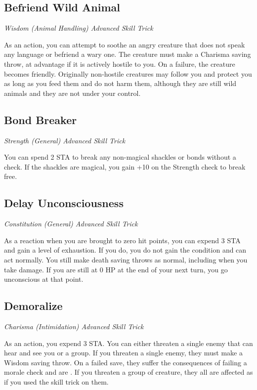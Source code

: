 \subsection{Befriend Wild Animal}

\textit{Wisdom (Animal Handling) Advanced Skill Trick}

As an action, you can attempt to soothe an angry creature that does not speak any language or befriend a wary one. The creature must make a Charisma saving throw, at advantage if it is actively hostile to you. On a failure, the creature becomes friendly. Originally non-hostile creatures may follow you and protect you as long as you feed them and do not harm them, although they are still wild animals and they are not under your control.

\subsection{Bond Breaker}

\textit{Strength (General) Advanced Skill Trick}

You can spend 2 STA to break any non-magical shackles or bonds without a check. If the shackles are magical, you gain +10 on the Strength check to break free.

\subsection{Delay Unconsciousness}

\textit{Constitution (General) Advanced Skill Trick}

As a reaction when you are brought to zero hit points, you can expend 3 STA and gain a level of exhaustion. If you do, you do not gain the  condition and can act normally. You still make death saving throws as normal, including when you take damage. If you are still at 0 HP at the end of your next turn, you go unconscious at that point.

\subsection{Demoralize}\label{st:demoralize}

\textit{Charisma (Intimidation) Advanced Skill Trick}

As an action, you expend 3 STA. You can either threaten a single enemy that can hear and see you or a group. If you threaten a single enemy, they must make a Wisdom saving throw. On a failed save, they suffer the consequences of failing a morale check and are . If you threaten a group of creature, they all are affected as if you used the  skill trick on them.

